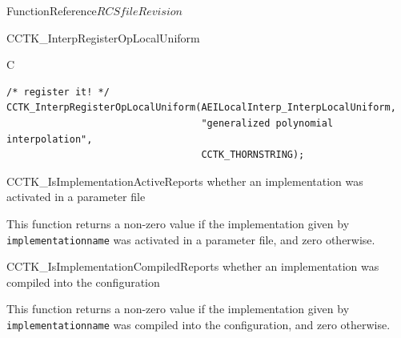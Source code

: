 \begin{cactuspart}{FunctionReference}{$RCSfile$}{$Revision$}
\begin{FunctionDescription}{CCTK\_InterpRegisterOpLocalUniform}
\begin{ExampleSection}
\begin{Example}{C}
\begin{verbatim}
/* register it! */
CCTK_InterpRegisterOpLocalUniform(AEILocalInterp_InterpLocalUniform,
                                  "generalized polynomial interpolation",
                                  CCTK_THORNSTRING);
\end{verbatim}
\end{Example}
\end{ExampleSection}
\end{FunctionDescription}


\begin{CCTKFunc}{CCTK\_IsImplementationActive}{Reports whether an implementation was activated in a parameter file}
\label{CCTK-IsImplementationActive}
\showargs
\begin{params}
\end{params}
\begin{discussion}
This function returns a non-zero value if the implementation given by
{\tt implementationname} was activated in a parameter file, and zero
otherwise.
\end{discussion}
\end{CCTKFunc}

\begin{CCTKFunc}{CCTK\_IsImplementationCompiled}{Reports whether an
implementation was compiled into the configuration}
\label{CCTK-IsImplementationCompiled}
\showargs
\begin{params}
\end{params}
\begin{discussion}
This function returns a non-zero value if the implementation given by
{\tt implementationname} was compiled into the configuration, and zero
otherwise.
\end{discussion}
\end{CCTKFunc}


\end{cactuspart}
